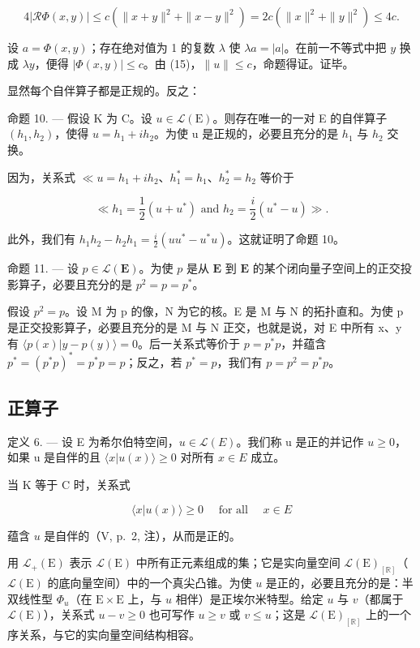 \[
4 \left| \mathcal {R} \Phi (x, y) \right| \leqslant c \left(\| x + y \| ^ {2} + \| x - y \| ^ {2}\right) = 2 c \left(\| x \| ^ {2} + \| y \| ^ {2}\right) \leqslant 4 c.
\]

设 \(a = \Phi(x, y)\)；存在绝对值为 1 的复数 \(\lambda\) 使 \(\lambda a = |a|\)。在前一不等式中把 \(y\) 换成 \(\lambda y\)，便得 \(|\Phi(x,y)| \leqslant c\)。由 (15)，\(\|u\| \leqslant c\)，命题得证。证毕。

显然每个自伴算子都是正规的。反之：

命题 10. --- 假设 K 为 C。设 \(u \in \mathcal{L}(\mathrm{E})\)。则存在唯一的一对 E 的自伴算子 \((h_1, h_2)\)，使得 \(u = h_1 + ih_2\)。为使 u 是正规的，必要且充分的是 \(h_1\) 与 \(h_2\) 交换。

因为，关系式 \(\ll u = h_1 + ih_2\)、\(h_1^* = h_1\)、\(h_2^* = h_2\) 等价于

\[
\ll h _ {1} = \frac {1}{2} (u + u ^ {*}) \text { and } h _ {2} = \frac {i}{2} (u ^ {*} - u) \gg .
\]

此外，我们有 \(h_1h_2 - h_2h_1 = \frac{i}{2} (uu^* - u^*u)\)。这就证明了命题 10。

命题 11. --- 设 \(p \in \mathcal{L}(\mathbf{E})\)。为使 \(p\) 是从 \(\mathbf{E}\) 到 \(\mathbf{E}\) 的某个闭向量子空间上的正交投影算子，必要且充分的是 \(p^2 = p = p^*\)。

假设 \(p^{2} = p\)。设 M 为 p 的像，N 为它的核。E 是 M 与 N 的拓扑直和。为使 p 是正交投影算子，必要且充分的是 M 与 N 正交，也就是说，对 E 中所有 x、y 有 \(\langle p(x)|y - p(y)\rangle = 0\)。后一关系式等价于 \(p = p^{*}p\)，并蕴含 \(p^{*} = (p^{*}p)^{*} = p^{*}p = p\)；反之，若 \(p^{*} = p\)，我们有 \(p = p^{2} = p^{*}p\)。

\subsection{正算子}

定义 6. --- 设 E 为希尔伯特空间，\(u \in \mathcal{L}(E)\)。我们称 u 是正的并记作 \(u \geqslant 0\)，如果 u 是自伴的且 \(\langle x|u(x) \rangle \geqslant 0\) 对所有 \(x \in E\) 成立。

当 K 等于 C 时，关系式

\[
\langle x | u (x) \rangle \geqslant 0 \quad \text { for   all } \quad x \in E
\]

蕴含 \(u\) 是自伴的（V, p.~2, 注），从而是正的。

用 \(\mathcal{L}_{+}(\mathrm{E})\) 表示 \(\mathcal{L}(\mathrm{E})\) 中所有正元素组成的集；它是实向量空间 \(\mathcal{L}(\mathrm{E})_{[\mathbb{R}]}\)（\(\mathcal{L}(\mathrm{E})\) 的底向量空间）中的一个真尖凸锥。为使 \(u\) 是正的，必要且充分的是：半双线性型 \(\Phi_u\)（在 \(\mathrm{E} \times \mathrm{E}\) 上，与 \(u\) 相伴）是正埃尔米特型。给定 \(u\) 与 \(v\)（都属于 \(\mathcal{L}(\mathrm{E})\)），关系式 \(u - v \geqslant 0\) 也可写作 \(u \geqslant v\) 或 \(v \leqslant u\)；这是 \(\mathcal{L}(\mathrm{E})_{[\mathbb{R}]}\) 上的一个序关系，与它的实向量空间结构相容。

